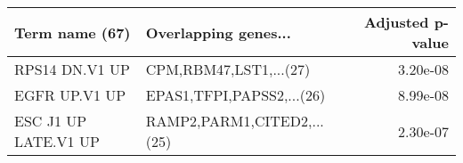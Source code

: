 \begin{tabular}{llr}
\toprule
      Term name (67) &       Overlapping genes... &  Adjusted p-value \\
\midrule
      RPS14 DN.V1 UP &     CPM,RBM47,LST1,...(27) &          3.20e-08 \\
       EGFR UP.V1 UP &  EPAS1,TFPI,PAPSS2,...(26) &          8.99e-08 \\
ESC J1 UP LATE.V1 UP & RAMP2,PARM1,CITED2,...(25) &          2.30e-07 \\
\bottomrule
\end{tabular}
